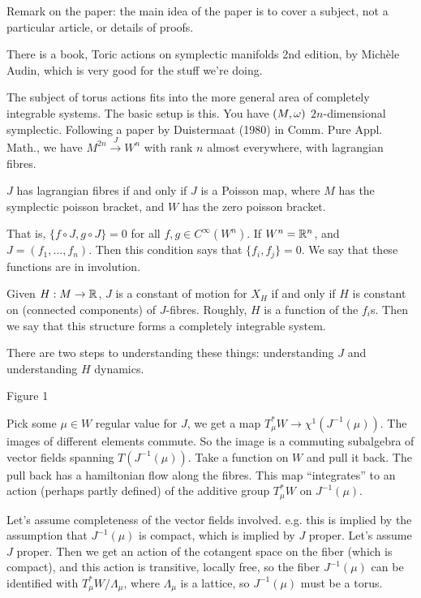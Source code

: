  \setcounter{lecture}{19}

 Remark on the paper: the main idea of the paper is to cover a subject, not a
 particular article, or details of proofs.

 There is a book, Toric actions on symplectic manifolds 2nd edition, by Mich\`ele
 Audin, which is very good for the stuff we're doing.

 The subject of torus actions fits into the more general area of completely integrable
 systems.  The basic setup is this.  You have $(M,\omega)$ $2n$-dimensional symplectic.
 Following a paper by Duistermaat (1980) in Comm. Pure Appl. Math., we have
 $M^{2n}\xrightarrow{J} W^n$ with rank $n$ almost everywhere, with lagrangian fibres.
 \begin{lemma}
   $J$ has lagrangian fibres if and only if $J$ is a Poisson map, where $M$ has the
   symplectic poisson bracket, and $W$ has the zero poisson bracket.
 \end{lemma}
 That is, $\{f\circ J,g\circ J\}=0$ for all $f,g\in C^\infty(W^n)$.  If $W^n=\mathbb{R}^n$,
 and $J=(f_1,\dots, f_n)$.  Then this condition says that $\{f_i,f_j\}=0$.  We say
 that these functions are in involution.

 Given $H:M\to \mathbb{R}$, $J$ is a constant of motion for $X_H$ if and only if $H$ is
 constant on (connected components) of $J$-fibres.  Roughly, $H$ is a function of the
 $f_i$s.  Then we say that this structure forms a completely integrable system.

 There are two steps to understanding these things: understanding $J$ and
 understanding $H$ dynamics.

 Figure 1

 Pick some $\mu\in W$ regular value for $J$, we get a map $T_\mu^*W\to
\chi^1(J^{-1}(\mu))$.  The images of different elements commute.  So the image is a
commuting subalgebra of vector fields spanning $T(J^{-1}(\mu))$.  Take a function on
$W$ and pull it back.  The pull back has a hamiltonian flow along the fibres.  This
map ``integrates'' to an action (perhaps partly defined) of the additive group
$T_\mu^*W$ on $J^{-1}(\mu)$.

Let's assume completeness of the vector fields involved.  e.g. this is implied by the
assumption that $J^{-1}(\mu)$ is compact, which is implied by $J$ proper.  Let's
assume $J$ proper.  Then we get an action of the cotangent space on the fiber (which
is compact), and this action is transitive, locally free, so the fiber $J^{-1}(\mu)$
can be identified with $T^*_\mu W/\Lambda_\mu$, where $\Lambda_\mu$ is a lattice, so
$J^{-1}(\mu)$ must be a torus.

